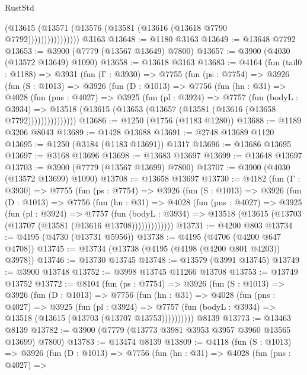 \begin{lexlean}{RustStd}
\begin{coremodule}
                        (@13615 (@13571 (@13576 (@13581 (@13616 (@13618 @7790 @7792))))))))))))))))
    @3163
@13648 := @1180 @3163
@13649 := @13648 @7792
@13653 := @3900 (@7779 (@13567 @13649) @7800)
@13657 := @3900 (@4030 (@13572 @13649) @1090)
@13658 := @13618 @3163
@13683 := @4164
    (fun (tail0 : @1188) =>
    @3931
      (fun (Γ : @3930) =>
      @7755
        (fun (ps : @7754) =>
        @3926
          (fun (S : @1013) =>
          @3926
            (fun (D : @1013) =>
            @7756
              (fun (hn : @31) =>
              @4028
                (fun (pns : @4027) =>
                @3925
                  (fun (pl : @3924) =>
                  @7757
                    (fun (bodyL : @3934) =>
                    @13518 (@13615 (@13653 (@13657 (@13581 (@13616 (@13658 @7792)))))))))))))))
@13686 := @1250 (@1756 (@1183 @1280))
@13688 := @1189 @3206 @8043
@13689 := @1428 @13688
@13691 := @2748 @13689 @1120
@13695 := @1250 (@3184 (@1183 @13691)) @1317
@13696 := @13686 @13695
@13697 := @3168 @13696
@13698 := @13683 @13697
@13699 := @13648 @13697
@13703 := @3900 (@7779 (@13567 @13699) @7800)
@13707 := @3900 (@4030 (@13572 @13699) @1090)
@13708 := @13658 @13697
@13730 := @4182
    (fun (Γ : @3930) =>
    @7755
      (fun (ps : @7754) =>
      @3926
        (fun (S : @1013) =>
        @3926
          (fun (D : @1013) =>
          @7756
            (fun (hn : @31) =>
            @4028
              (fun (pns : @4027) =>
              @3925
                (fun (pl : @3924) =>
                @7757
                  (fun (bodyL : @3934) =>
                  @13518 (@13615 (@13703 (@13707 (@13581 (@13616 @13708)))))))))))))
@13731 := @4200 @803
@13734 := @4195 (@4730 (@13731 @5956))
@13738 := @4195 (@4706 (@4200 @647 @4708))
@13745 := @13734 (@13738 (@4195 (@4198 (@4200 @801 @4203)) @3978))
@13746 := @13730 @13745
@13748 := @13579 (@3991 @13745)
@13749 := @3900 @13748
@13752 := @3998 @13745 @11266 @13708
@13753 := @13749 @13752
@13772 := @8104
    (fun (ps : @7754) =>
    @3926
      (fun (S : @1013) =>
      @3926
        (fun (D : @1013) =>
        @7756
          (fun (hn : @31) =>
          @4028
            (fun (pns : @4027) =>
            @3925
              (fun (pl : @3924) =>
              @7757 (fun (bodyL : @3934) => @13518 (@13615 (@13703 (@13707 @13753))))))))))
    @8139
@13773 := @13463 @8139
@13782 := @3900 (@7779 (@13773 @3981 @3953 @3957 @3960 @13565 @13699) @7800)
@13783 := @13474 @8139
@13809 := @4118
    (fun (S : @1013) =>
    @3926
      (fun (D : @1013) =>
      @7756
        (fun (hn : @31) =>
        @4028
          (fun (pns : @4027) =>

\end{coremodule}
\end{lexlean}
